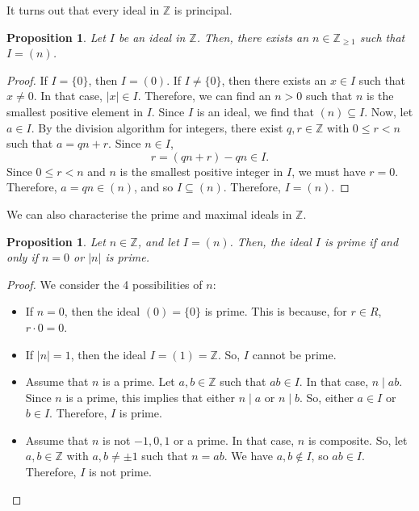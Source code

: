 \documentclass[a4paper, openany]{memoir}
\theoremstyle{definition}
\theoremstyle{plain}
\newtheorem{proposition}[definition]{Proposition}
\begin{document}
It turns out that every ideal in $\mathbb{Z}$ is principal.
\begin{proposition}
Let $I$ be an ideal in $\mathbb{Z}$. Then, there exists an $n \in \mathbb{Z}_{\geqslant 1}$ such that $I = (n)$.
\end{proposition}
\begin{proof}
If $I = \{0\}$, then $I = (0)$. If $I \neq \{0\}$, then there exists an $x \in I$ such that $x \neq 0$. In that case, $|x| \in I$. Therefore, we can find an $n > 0$ such that $n$ is the smallest positive element in $I$. Since $I$ is an ideal, we find that $(n) \subseteq I$. Now, let $a \in I$. By the division algorithm for integers, there exist $q, r \in \mathbb{Z}$ with $0 \leqslant r < n$ such that $a = qn + r$. Since $n \in I$, 
\[r = (qn + r) - qn \in I.\]
Since $0 \leqslant r < n$ and $n$ is the smallest positive integer in $I$, we must have $r = 0$. Therefore, $a = qn \in (n)$, and so $I \subseteq (n)$. Therefore, $I = (n)$.
\end{proof}
\noindent We can also characterise the prime and maximal ideals in $\mathbb{Z}$.
\begin{proposition}
Let $n \in \mathbb{Z}$, and let $I = (n)$. Then, the ideal $I$ is prime if and only if $n = 0$ or $|n|$ is prime.
\end{proposition}
\begin{proof}
We consider the 4 possibilities of $n$:
\begin{itemize}
    \item If $n = 0$, then the ideal $(0) = \{0\}$ is prime. This is because, for $r \in R$, $r \cdot 0 = 0$.
    
    \item If $|n| = 1$, then the ideal $I = (1) = \mathbb{Z}$. So, $I$ cannot be prime.
    
    \item Assume that $n$ is a prime. Let $a, b \in \mathbb{Z}$ such that $ab \in I$. In that case, $n \mid ab$. Since $n$ is a prime, this implies that either $n \mid a$ or $n \mid b$. So, either $a \in I$ or $b \in I$. Therefore, $I$ is prime.
    
    \item Assume that $n$ is not $-1, 0, 1$ or a prime. In that case, $n$ is composite. So, let $a, b \in \mathbb{Z}$ with $a, b \neq \pm 1$ such that $n = ab$. We have $a, b \not\in I$, so $ab \in I$. Therefore, $I$ is not prime.
\end{itemize}
\end{proof}
\end{document}
